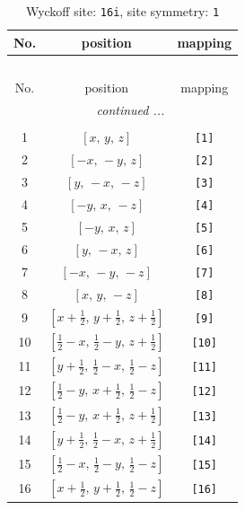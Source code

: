 \documentclass[fleqn,8pt]{jsarticle}
\begin{document}
\begin{longtable}{ccc}
\caption{Wyckoff site: {\tt 16i}, site symmetry: {\tt 1}}
 \\
 \hline \hline
No. & position & mapping \\ \hline \endfirsthead

\multicolumn{2}{l}{\tablename\ \thetable{}} \\
 \hline \hline
No. & position & mapping \\ \hline \endhead

 \hline \hline
\multicolumn{2}{r}{\footnotesize\it continued ...} \\ \endfoot

 \hline \hline
\multicolumn{2}{r}{} \\ \endlastfoot

1 & $\left[ x,\, y,\, z \right]$ & {\tt [1]} \\ \hline
2 & $\left[ - x,\, - y,\, z \right]$ & {\tt [2]} \\ \hline
3 & $\left[ y,\, - x,\, - z \right]$ & {\tt [3]} \\ \hline
4 & $\left[ - y,\, x,\, - z \right]$ & {\tt [4]} \\ \hline
5 & $\left[ - y,\, x,\, z \right]$ & {\tt [5]} \\ \hline
6 & $\left[ y,\, - x,\, z \right]$ & {\tt [6]} \\ \hline
7 & $\left[ - x,\, - y,\, - z \right]$ & {\tt [7]} \\ \hline
8 & $\left[ x,\, y,\, - z \right]$ & {\tt [8]} \\ \hline
9 & $\left[ x + \frac{1}{2},\, y + \frac{1}{2},\, z + \frac{1}{2} \right]$ & {\tt [9]} \\ \hline
10 & $\left[ \frac{1}{2} - x,\, \frac{1}{2} - y,\, z + \frac{1}{2} \right]$ & {\tt [10]} \\ \hline
11 & $\left[ y + \frac{1}{2},\, \frac{1}{2} - x,\, \frac{1}{2} - z \right]$ & {\tt [11]} \\ \hline
12 & $\left[ \frac{1}{2} - y,\, x + \frac{1}{2},\, \frac{1}{2} - z \right]$ & {\tt [12]} \\ \hline
13 & $\left[ \frac{1}{2} - y,\, x + \frac{1}{2},\, z + \frac{1}{2} \right]$ & {\tt [13]} \\ \hline
14 & $\left[ y + \frac{1}{2},\, \frac{1}{2} - x,\, z + \frac{1}{2} \right]$ & {\tt [14]} \\ \hline
15 & $\left[ \frac{1}{2} - x,\, \frac{1}{2} - y,\, \frac{1}{2} - z \right]$ & {\tt [15]} \\ \hline
16 & $\left[ x + \frac{1}{2},\, y + \frac{1}{2},\, \frac{1}{2} - z \right]$ & {\tt [16]} \\
\end{longtable}
\end{document}
